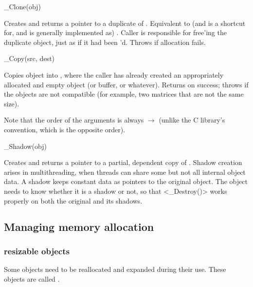 \begin{sreapi}

\hypertarget{ifc:Clone}
{\item[\_Clone(obj)]}

Creates and returns a pointer to a duplicate of .
Equivalent to (and is a shortcut for, and is generally implemented as)
. Caller is responsible
for free'ing the duplicate object, just as if it had been
'd. Throws  if allocation fails.


\hypertarget{ifc:Copy}
{\item[\_Copy(src, dest)]}

Copies  object into , where the caller has
already created an appropriately allocated and empty 
object (or buffer, or whatever). Returns  on success;
throws  if the objects are not compatible (for
example, two matrices that are not the same size).

Note that the order of the arguments is always 
$\rightarrow$  (unlike the C library's 
convention, which is the opposite order).


\hypertarget{ifc:Shadow}
{\item[\_Shadow(obj)]}

Creates and returns a pointer to a partial, dependent copy of
. Shadow creation arises in multithreading, when threads
can share some but not all internal object data. A shadow keeps
constant data as pointers to the original object.  The object needs to
know whether it is a shadow or not, so that <_Destroy()> works
properly on both the original and its shadows.

\end{sreapi}

  \subsection{Managing memory allocation}

  \subsubsection{resizable objects}

Some objects need to be reallocated and expanded during their use.
These objects are called .

